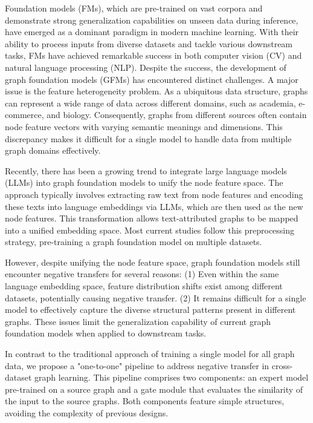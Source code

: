 Foundation models (FMs), which are pre-trained on vast corpora and demonstrate strong generalization capabilities on unseen data during inference, have emerged as a dominant paradigm in modern machine learning. 
With their ability to process inputs from diverse datasets and tackle various downstream tasks, FMs have achieved remarkable success in both computer vision (CV) and natural language processing (NLP). 
Despite the success, the development of graph foundation models (GFMs) has encountered distinct challenges. A major issue is the feature heterogeneity problem. 
As a ubiquitous data structure, graphs can represent a wide range of data across different domains, such as academia, e-commerce, and biology. 
Consequently, graphs from different sources often contain node feature vectors with varying semantic meanings and dimensions. 
This discrepancy makes it difficult for a single model to handle data from multiple graph domains effectively.

Recently, there has been a growing trend to integrate large language models (LLMs) into graph foundation models to unify the node feature space. 
The approach typically involves extracting raw text from node features and encoding these texts into language embeddings via LLMs, which are then used as the new node features. 
This transformation allows text-attributed graphs to be mapped into a unified embedding space. 
Most current studies follow this preprocessing strategy, pre-training a graph foundation model on multiple datasets.

However, despite unifying the node feature space, graph foundation models still encounter  negative transfers for several reasons: 
(1) Even within the same language embedding space, feature distribution shifts exist among different datasets, potentially causing negative transfer. 
(2) It remains difficult for a single model to effectively capture the diverse structural patterns present in different graphs. These issues limit the  generalization capability of current graph foundation models when applied to downstream tasks.  



In contrast to the traditional approach of training a single model for all graph data, we propose a "one-to-one" pipeline to  address negative transfer in cross-dataset graph learning.  This pipeline comprises two components: an expert model pre-trained on a source graph and a gate module that evaluates the similarity of the input to the source graphs.  
Both components feature simple structures, avoiding the complexity of previous designs.



